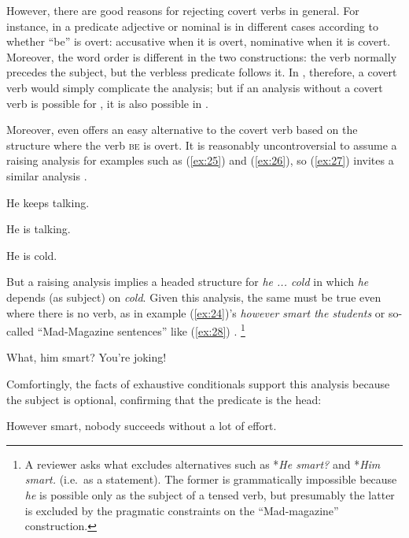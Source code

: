 \documentclass[output=paper,biblatex,babelshorthands,newtxmath,draftmode,colorlinks,citecolor=brown]{langscibook}
\begin{document}
However, there are good reasons for rejecting covert verbs in general. For instance, in 
a predicate adjective or nominal is in different cases according to whether ``be'' is overt:
accusative when it is overt, nominative when it is covert. Moreover, the word order is different in
the two constructions: the verb normally precedes the subject, but the verbless predicate follows
it. In , therefore, a covert verb would simply complicate the analysis; but if an
analysis without a covert verb is possible for , it is also possible in .

\largerpage
Moreover, even  offers an easy alternative to the covert verb based on the structure
where the verb \textsc{be} is overt. It is reasonably uncontroversial to assume a raising analysis
for examples such as (\ref{ex:25}) and (\ref{ex:26}), so (\ref{ex:27}) invites a similar analysis
\citep{MuellerPredication,MuellerCopula}.

\eal
\ex \label{ex:25} He keeps talking.

\ex \label{ex:26} He is talking.

\ex \label{ex:27} He is cold.
\zl

\noindent
But a raising analysis implies a headed structure for \emph{he ... cold} in which \emph{he} depends (as subject) on \emph{cold}. Given this analysis, the same must be true even where there is no verb, as in example (\ref{ex:24})'s \emph{however smart the students} or so-called ``Mad-Magazine sentences'' like (\ref{ex:28}) \citep{Lambrecht:90}.%
%
\footnote{A reviewer asks what excludes alternatives such as *\emph{He smart?} and *\emph{Him smart.} (i.e.\ as a statement). The former is grammatically impossible because \emph{he} is possible only as the subject of a tensed verb, but presumably the latter is excluded by the pragmatic constraints on the ``Mad-magazine'' construction.}%
%

\begin{exe}
	\ex \label{ex:28} What, him smart? You're joking!
\end{exe}

\noindent
Comfortingly, the facts of exhaustive conditionals support this analysis because the subject is
optional, confirming that the predicate is the head:

\begin{exe}
	\ex \label{ex:29} However smart, nobody succeeds without a lot of effort.
\end{exe}
\end{document}
